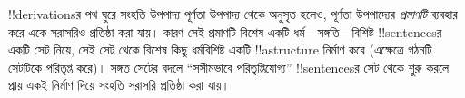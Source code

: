 \documentclass[../../../include/open-logic-section]{subfiles}
\begin{document}
!!{derivation}sর পথ ঘুরে সংহতি উপপাদ্য পূর্ণতা উপপাদ্য থেকে অনুসৃত হলেও,
পূর্ণতা উপপাদ্যের \emph{প্রমাণটি} ব্যবহার করে একে সরাসরিও প্রতিষ্ঠা করা
যায়। কারণ সেই প্রমাণটি বিশেষ একটি ধর্ম—সঙ্গতি—বিশিষ্ট !!{sentence}sর
একটি সেট নিয়ে, সেই সেট থেকে বিশেষ কিছু ধর্মবিশিষ্ট একটি !!a{structure}
নির্মাণ করে (এক্ষেত্রে গঠনটি সেটটিকে পরিতৃপ্ত করে)। সঙ্গত সেটের বদলে
“সসীমভাবে পরিতৃপ্তিযোগ্য” !!{sentence}sর সেট থেকে শুরু করলে প্রায় একই
নির্মাণ দিয়ে সংহতি সরাসরি প্রতিষ্ঠা করা যায়।
\end{document}
